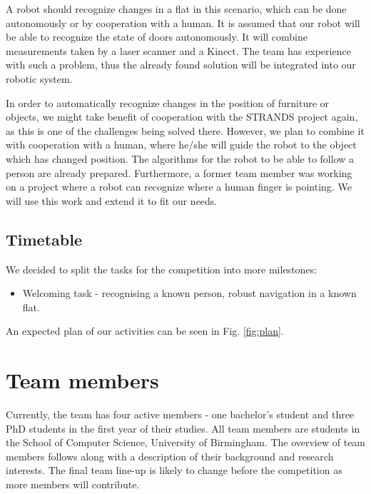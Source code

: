 \documentclass[conference]{IEEEtran}
\begin{document}
A robot should recognize changes in a flat in this scenario, which can be done autonomously or by cooperation with a human. It is assumed that our robot will be able to recognize the state of doors autonomously. It will combine measurements taken by a laser scanner and a Kinect. The team has experience with such a problem, thus the already found solution will be integrated into our robotic system. 

In order to automatically recognize changes in the position of furniture or objects, we might take benefit of cooperation with the STRANDS project again, as this is one of the challenges being solved there. However, we plan to combine it with cooperation with a human, where he/she will guide the robot to the object which has changed position. The algorithms for the robot to be able to follow a person are already prepared. Furthermore, a former team member was working on a project where a robot can recognize where a human finger is pointing. We will use this work and extend it to fit our needs.

\subsection{Timetable}
We decided to split the tasks for the competition into more milestones:
\begin{itemize}
\item Welcoming task - recognising a known person, robust navigation in a known flat. 
\end{itemize}
An expected plan of our activities can be seen in Fig. \ref{fig:plan}.


\section{Team members}
Currently, the team has four active members - one bachelor's student and three PhD students in the first year of their studies. All team members are students in the School of Computer Science, University of Birmingham. The overview of team members follows along with a description of their background and research interests. The final team line-up is likely to change before the competition as more members will contribute.
\end{document}
